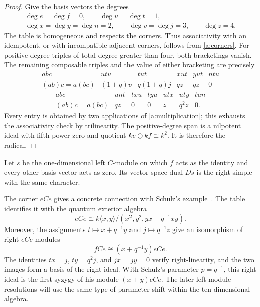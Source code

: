 \begin{proof}
Give the basis vectors the degrees
\[
\begin{gathered}
\deg e=\deg f=0,\qquad \deg u=\deg t=1,\\
\deg x=\deg y=\deg n=2,\qquad
\deg v=\deg j=3,\qquad \deg z=4.
\end{gathered}
\]
The table is homogeneous and respects the corners.  Thus associativity
with an idempotent, or with incompatible adjacent corners, follows
from \eqref{a:corners}.  For positive-degree triples of total degree
greater than four, both bracketings vanish.  The remaining composable
triples and the value of either bracketing are precisely
\[
\begin{array}{c|ccccc}
abc&utu&tut&xut&yut&ntu\\ \hline
(ab)c=a(bc)&(1+q)v&q(1+q)j&qz&qz&0
\end{array}
\]
\[
\begin{array}{c|cccccc}
abc&unt&txu&tyu&utx&uty&tun\\ \hline
(ab)c=a(bc)&qz&0&0&z&q^2z&0.
\end{array}
\]
Every entry is obtained by two applications of
\eqref{a:multiplication}; this exhausts the associativity check by
trilinearity.  The positive-degree span is a nilpotent ideal with
fifth power zero and quotient \(ke\oplus kf\cong k^2\).  It is therefore
the radical.
\end{proof}

Let \(s\) be the one-dimensional left \(C\)-module on which \(f\)
acts as the identity and every other basis vector acts as zero.
Its vector space dual \(Ds\) is the right simple with the same character.

The corner \(eCe\) gives a concrete connection with Schulz's
example~\cite[Example~7]{Schulz1995}. The table identifies it with
the quantum exterior algebra
\[
 eCe\cong k\langle x,y\rangle/(x^2,y^2,yx-q^{-1}xy).
\]
Moreover, the assignments
\(t\mapsto x+q^{-1}y\) and \(j\mapsto q^{-1}z\) give an
isomorphism of right \(eCe\)-modules
\[
 fCe\cong(x+q^{-1}y)eCe.
\]
The identities \(tx=j\), \(ty=q^2j\), and \(jx=jy=0\) verify
right-linearity, and the two images form a basis of the right ideal.
With Schulz's
parameter \(p=q^{-1}\), this right ideal is the first syzygy of his
module \((x+y)eCe\). The later left-module resolutions will use the
same type of parameter shift within the ten-dimensional algebra.

